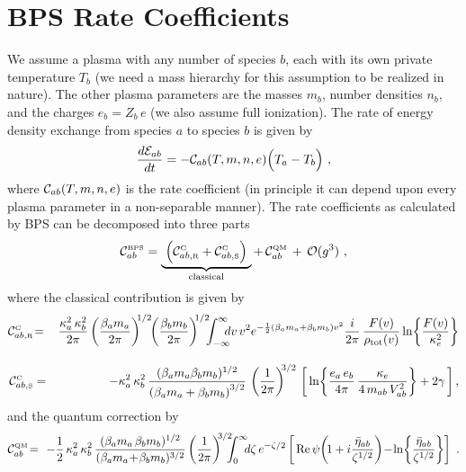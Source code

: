 \documentclass[preprint,12pt,eqsecnum,nofootinbib,amsmath,amssymb]{revtex4}
\newcommand{\smC}{{\rm\scriptscriptstyle C}}
\newcommand{\smR}{{\rm\scriptscriptstyle R}}
\newcommand{\smS}{{\rm\scriptscriptstyle S}}
\newcommand{\smQM}{{\rm\scriptscriptstyle QM}}
\newcommand{\smBPS}{{\rm\scriptscriptstyle BPS}}
\begin{document}
\pagebreak
\appendix
\section{BPS Rate Coefficients}
\label{sec:rate}

We assume a plasma with any number of species $b$, each with its own
private temperature $T_b$ (we need a mass hierarchy for this
assumption to be realized in nature). The other plasma parameters are
the masses $m_b$, number densities $n_b$, and the charges $e_b = Z_b
\, e$ (we also assume full ionization). The rate of energy density
exchange from species $a$ to species $b$ is given by
\begin{eqnarray}
  \frac{d{\cal E}_{ab}}{dt}
  =
  - {\cal C}_{ab}(T,m,n,e)\Big(T_a - T_b \Big) \ ,
\label{eq:{eq:rate_ab}}
\end{eqnarray}
\noindent
where ${\cal C}_{ab}(T,m,n,e)$ is the rate coefficient (in principle
it can depend upon every plasma parameter in a non-separable manner).
The rate coefficients as calculated by BPS can be decomposed into
three parts
\begin{eqnarray}
  {\cal C}_{ab}^\smBPS
  =
  \underbrace{~
  \Big({\cal C}^\smC_{ab,\smR} 
  +
  {\cal C}^\smC_{ab,\smS} 
  \Big)
  ~}_\text{classical}
  + \,
  {\cal C}^\smQM_{ab} \,+\, {\cal O}(g^3)\ ,
\end{eqnarray}
where the classical contribution is given by
\begin{eqnarray}
  {\cal C}^\smC_{ab,\smR} 
  &\!=\!&
  \frac{\kappa_a^2\, \kappa_b^2}{2\pi}
  \left(\frac{\beta_a m_a}{2\pi} \right)^{\!\! 1/2} \!\!
  \left(\frac{\beta_b m_b}{2\pi} \right)^{\!\! 1/2} \!\!\!
  \int_{-\infty}^{\infty} \!\!\!\! dv \, v^2 
  e^{- \frac{1}{2}( \beta_a m_a + \beta_b m_b) v^2 }  
  \frac{i}{2 \pi} \,\frac{F(v)}{\rho_\text{tot}(v)}
  \ln\! \left\{ \frac{F(v)}{\kappa_e^2}\right\} 
\label{CabA}
\\[10pt]
  {\cal C}^\smC_{ab,\smS} 
  &=& 
  \!-{\kappa_a^2\, \kappa_b^2 } \,
  \frac{ (\beta_a m_a \beta_b m_b)^{1/2}}{\left( \beta_a m_a + 
  \beta_b m_b \right)^{3/2} } \,\left( \frac{1}{2\pi} \right)^{\!\!3/2}\, 
  \left[\,\ln\!\left\{ \frac{e_a\,e_b}{4 \pi}\,
  \frac{\kappa_e}{4 \, m_{ab} \, V^2_{ab}}\right\} 
  + 2 \gamma\,  \right]  ,
\label{CabB}
\end{eqnarray}
and the quantum correction by 
\begin{eqnarray}
  {\cal C}^\smQM_{ab} 
  &\!=\!&  
  \!-\frac{1}{2} \, \kappa_a^2\, \kappa_b^2 \, 
  \frac{(\beta_a m_a \, \beta_b m_b)^{1/2}}{(\beta_a m_a \!+\! 
  \beta_b m_b)^{3/2}} 
  \left(\frac{1}{2\pi}\right)^{\!\!3/2} \!\!\!\!
  \int_0^\infty \!\!\! d \zeta\, e^{-\zeta/2} 
  \left[\,{\rm Re}\,
  \psi\!\left(\!1 + i\frac{\bar\eta_{ab}}{\zeta^{1/2}}\right) \!-\! 
  \ln\!\left\{ \frac{\bar\eta_{ab}}{\zeta^{1/2}}\right\}
  \right] \ .
\nonumber \\
\label{CabC}
\end{eqnarray}
\end{document}
